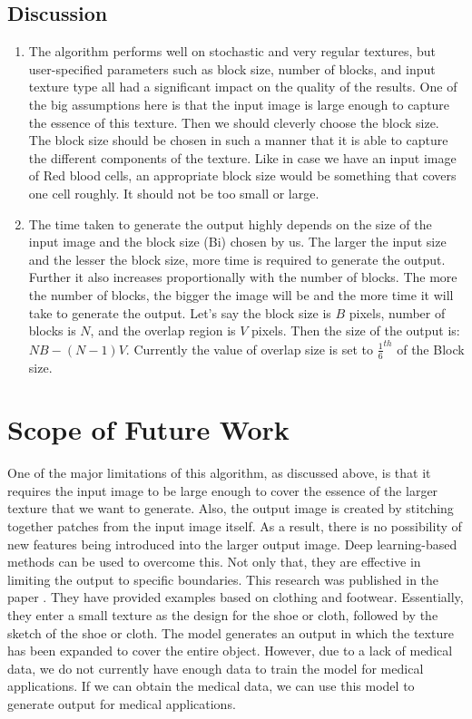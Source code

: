 \documentclass[12pt,a4paper]{report}
\begin{document}
\section{Discussion}
\begin{enumerate}
  \item The algorithm performs well on stochastic and very regular textures, but user-specified parameters such as block size, number of blocks, and input texture type all had a significant impact on the quality of the results. One of the big assumptions here is that the input image is large enough to capture the essence of this texture. Then we should cleverly choose the block size. The block size should be chosen in such a manner that it is able to capture the different components of the texture. Like in case we have an input image of Red blood cells, an appropriate block size would be something that covers one cell roughly. It should not be too small or large.
  \item The time taken to generate the output highly depends on the size of the input image and the block size (Bi) chosen by us. The larger the input size and the lesser the block size, more time is required to generate the output. Further it also increases proportionally with the number of blocks. The more the number of blocks, the bigger the image will be and the more time it will take to generate the output. Let's say the block size is $B$ pixels, number of blocks is $N$, and the overlap region is $V$ pixels. Then the size of the output is: $NB - (N-1)V$. Currently the value of overlap size is set to $\frac{1}{6}^{th}$ of the Block size.
\end{enumerate}


\chapter{Scope of Future Work}

One of the major limitations of this algorithm, as discussed above, is that it requires the input image to be large enough to cover the essence of the larger texture that we want to generate. Also, the output image is created by stitching together patches from the input image itself. As a result, there is no possibility of new features being introduced into the larger output image. Deep learning-based methods can be used to overcome this. Not only that, they are effective in limiting the output to specific boundaries. This research was published in the paper \cite[TextureGAN: Controlling Deep Image Synthesis with Texture Patches]{b2}. They have provided examples based on clothing and footwear. Essentially, they enter a small texture as the design for the shoe or cloth, followed by the sketch of the shoe or cloth. The model generates an output in which the texture has been expanded to cover the entire object. However, due to a lack of medical data, we do not currently have enough data to train the model for medical applications. If we can obtain the medical data, we can use this model to generate output for medical applications.
\end{document}
